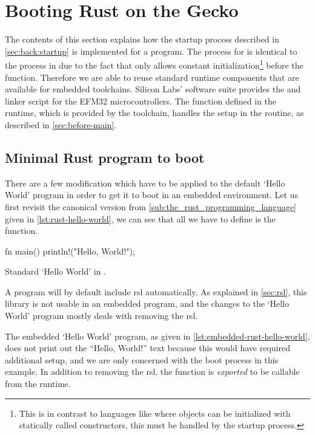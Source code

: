 \section{Booting Rust on the Gecko}
\label{sec:impl:booting}

The contents of this section explains how the startup process described in \autoref{sec:back:startup} is implemented for a {\rust} program.
The process for {\rust} is identical to the process in {\C} due to the fact that {\rust} only allows constant initialization\footnote{This is in contrast to languages like {\Cpp} where objects can be initialized with statically called constructors, this must be handled by the startup process.} before the {\main} function.
Therefore we are able to reuse standard runtime components that are available for {\C} embedded toolchains.
Silicon Labs' software suite provides the  and linker script for the EFM32 microcontrollers.
The  function defined in the {\C} runtime, which is provided by the {\armgcc} toolchain, handles the setup in the  routine, as described in \autoref{sec:before-main}.

\subsection{Minimal Rust program to boot}
\label{ssec:minimal_rust_program_to_boot}

There are a few modification which have to be applied to the default `Hello World' program in order to get it to boot in an embedded environment.
Let us first revisit the canonical version from \autoref{sub:the_rust_programming_language} given in \autoref{lst:rust-hello-world}, we can see that all we have to define is the  function.

\begin{listing}[H]
  \begin{rustcode}
fn main() {
  println!("Hello, World!");
}
  \end{rustcode}
  \caption{Standard `Hello World' in {\rust}.}
  \label{lst:rust-hello-world}
\end{listing}

A {\rust} program will by default include \gls{rsl} automatically.
As explained in \autoref{sec:rsl}, this library is not usable in an embedded program, and the changes to the `Hello World' program mostly deals with removing the \gls{rsl}.

The embedded `Hello World' program, as given in \autoref{lst:embedded-rust-hello-world}, does not print out the ``Hello, World!'' text because this would have required additional setup, and we are only concerned with the boot process in this example.
In addition to removing the \gls{rsl}, the {\main} function is \emph{exported} to be callable from the {\C} runtime.

